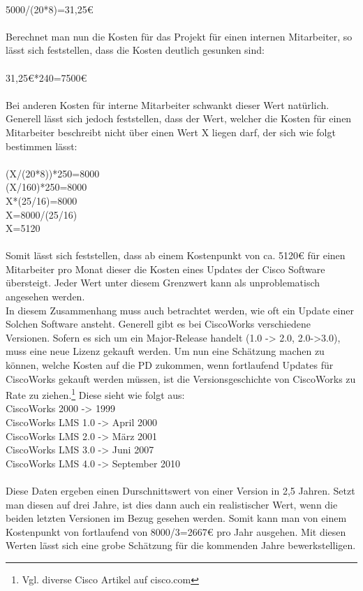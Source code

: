 \\
5000/(20*8)=31,25€\\
\\
Berechnet man nun die Kosten für das Projekt für einen internen Mitarbeiter, so lässt sich feststellen, dass die Kosten deutlich gesunken sind:\\
\\
31,25€*240=7500€\\
\\
Bei anderen Kosten für interne Mitarbeiter schwankt dieser Wert natürlich. Generell lässt sich jedoch feststellen, dass der Wert, welcher die Kosten für einen Mitarbeiter beschreibt nicht über einen Wert X liegen darf, der sich wie folgt bestimmen lässt:\\
\\
(X/(20*8))*250=8000\\
(X/160)*250=8000\\
X*(25/16)=8000\\
X=8000/(25/16)\\
X=5120\\
\\
Somit lässt sich feststellen, dass ab einem Kostenpunkt von ca. 5120€ für einen Mitarbeiter pro Monat dieser die Kosten eines Updates der Cisco Software übersteigt.
Jeder Wert unter diesem Grenzwert kann als unproblematisch angesehen werden.\\
In diesem Zusammenhang muss auch betrachtet werden, wie oft ein Update einer Solchen Software ansteht.
Generell gibt es bei CiscoWorks verschiedene Versionen.
Sofern es sich um ein Major-Release handelt (1.0 -> 2.0, 2.0->3.0), muss eine neue Lizenz gekauft werden.
Um nun eine Schätzung machen zu können, welche Kosten auf die PD zukommen, wenn fortlaufend Updates für CiscoWorks gekauft werden müssen, ist die Versionsgeschichte von CiscoWorks zu Rate zu ziehen.\footnote{Vgl. diverse Cisco Artikel auf cisco.com}
Diese sieht wie folgt aus:
\\
CiscoWorks 2000 -> 1999\\
CiscoWorks LMS 1.0 -> April 2000\\
CiscoWorks LMS 2.0 -> März 2001 \\
CiscoWorks LMS 3.0 -> Juni 2007\\
CiscoWorks LMS 4.0 -> September 2010\\
\\
Diese Daten ergeben einen Durschnittswert von einer Version in 2,5 Jahren.
Setzt man diesen auf drei Jahre, ist dies dann auch ein realistischer Wert, wenn die beiden letzten Versionen im Bezug gesehen werden. Somit kann man von einem Kostenpunkt von fortlaufend von 8000/3=2667€ pro Jahr ausgehen. Mit diesen Werten lässt sich eine grobe Schätzung für die kommenden Jahre bewerkstelligen.

